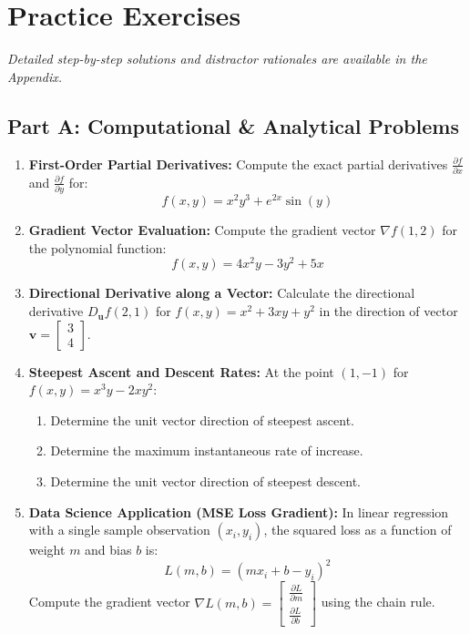 \newpage
\section{Practice Exercises}
\textit{Detailed step-by-step solutions and distractor rationales are available in the Appendix.}

\subsection*{Part A: Computational \& Analytical Problems}
\begin{enumerate}
\item \textbf{First-Order Partial Derivatives:} Compute the exact partial derivatives $\frac{\partial f}{\partial x}$ and $\frac{\partial f}{\partial y}$ for:
\begin{equation*}
f(x, y) = x^2 y^3 + e^{2x} \sin(y)
\end{equation*}

\item \textbf{Gradient Vector Evaluation:} Compute the gradient vector $\nabla f(1, 2)$ for the polynomial function:
\begin{equation*}
f(x, y) = 4x^2 y - 3y^2 + 5x
\end{equation*}

\item \textbf{Directional Derivative along a Vector:} Calculate the directional derivative $D_{\mathbf{u}} f(2, 1)$ for $f(x, y) = x^2 + 3xy + y^2$ in the direction of vector $\mathbf{v} = \begin{bmatrix} 3 \\ 4 \end{bmatrix}$.

\item \textbf{Steepest Ascent and Descent Rates:} At the point $(1, -1)$ for $f(x, y) = x^3 y - 2x y^2$:
\begin{enumerate}
    \item Determine the unit vector direction of steepest ascent.
    \item Determine the maximum instantaneous rate of increase.
    \item Determine the unit vector direction of steepest descent.
\end{enumerate}

\item \textbf{Data Science Application (MSE Loss Gradient):} In linear regression with a single sample observation $(x_i, y_i)$, the squared loss as a function of weight $m$ and bias $b$ is:
\begin{equation*}
L(m, b) = (m x_i + b - y_i)^2
\end{equation*}
Compute the gradient vector $\nabla L(m, b) = \begin{bmatrix} \frac{\partial L}{\partial m} \\ \frac{\partial L}{\partial b} \end{bmatrix}$ using the chain rule.
\end{enumerate}

